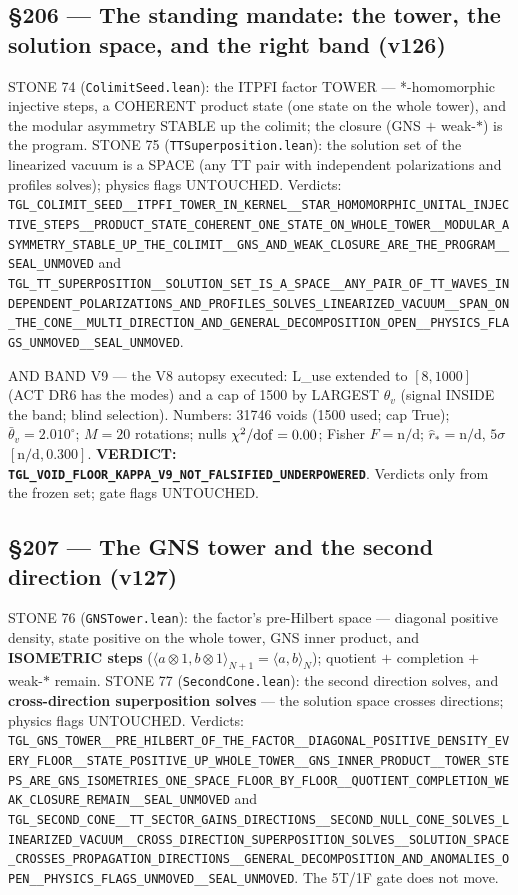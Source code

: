 \documentclass[11pt]{article}
\theoremstyle{definition}\newtheorem{deriv}{Derivation}
\begin{document}
\subsection*{\S206 --- The standing mandate: the tower, the solution space, and the right band (v126)}STONE 74 (\texttt{ColimitSeed.lean}): the ITPFI factor TOWER — *-homomorphic injective steps, a COHERENT product state (one state on the whole tower), and the modular asymmetry STABLE up the colimit; the closure (GNS $+$ weak-$*$) is the program. STONE 75 (\texttt{TTSuperposition.lean}): the solution set of the linearized vacuum is a SPACE (any TT pair with independent polarizations and profiles solves); physics flags UNTOUCHED. Verdicts: \texttt{TGL\_COLIMIT\_SEED\_\_ITPFI\_TOWER\_IN\_KERNEL\_\_STAR\_HOMOMORPHIC\_UNITAL\_INJECTIVE\_STEPS\_\_PRODUCT\_STATE\_COHERENT\_ONE\_STATE\_ON\_WHOLE\_TOWER\_\_MODULAR\_ASYMMETRY\_STABLE\_UP\_THE\_COLIMIT\_\_GNS\_AND\_WEAK\_CLOSURE\_ARE\_THE\_PROGRAM\_\_SEAL\_UNMOVED} and \texttt{TGL\_TT\_SUPERPOSITION\_\_SOLUTION\_SET\_IS\_A\_SPACE\_\_ANY\_PAIR\_OF\_TT\_WAVES\_INDEPENDENT\_POLARIZATIONS\_AND\_PROFILES\_SOLVES\_LINEARIZED\_VACUUM\_\_SPAN\_ON\_THE\_CONE\_\_MULTI\_DIRECTION\_AND\_GENERAL\_DECOMPOSITION\_OPEN\_\_PHYSICS\_FLAGS\_UNMOVED\_\_SEAL\_UNMOVED}.

AND BAND V9 — the V8 autopsy executed: L\_use extended to $[8,1000]$ (ACT DR6 has the modes) and a cap of 1500 by LARGEST $\theta_v$ (signal INSIDE the band; blind selection). Numbers: 31746 voids (1500 used; cap True); $\bar\theta_v=2.010^{\circ}$; $M=20$ rotations; nulls $\chi^2/{\rm dof}=0.00$; Fisher $F=\text{n/d}$; $\hat r_*=\text{n/d}$, $5\sigma$ $[\text{n/d},0.300]$. \textbf{VERDICT: \texttt{TGL\_VOID\_FLOOR\_KAPPA\_V9\_NOT\_FALSIFIED\_UNDERPOWERED}}. Verdicts only from the frozen set; gate flags UNTOUCHED.

\subsection*{\S207 --- The GNS tower and the second direction (v127)}STONE 76 (\texttt{GNSTower.lean}): the factor's pre-Hilbert space — diagonal positive density, state positive on the whole tower, GNS inner product, and \textbf{ISOMETRIC steps} ($\langle a\otimes1,b\otimes1\rangle_{N+1}=\langle a,b\rangle_N$); quotient $+$ completion $+$ weak-$*$ remain. STONE 77 (\texttt{SecondCone.lean}): the second direction solves, and \textbf{cross-direction superposition solves} — the solution space crosses directions; physics flags UNTOUCHED. Verdicts: \texttt{TGL\_GNS\_TOWER\_\_PRE\_HILBERT\_OF\_THE\_FACTOR\_\_DIAGONAL\_POSITIVE\_DENSITY\_EVERY\_FLOOR\_\_STATE\_POSITIVE\_UP\_WHOLE\_TOWER\_\_GNS\_INNER\_PRODUCT\_\_TOWER\_STEPS\_ARE\_GNS\_ISOMETRIES\_ONE\_SPACE\_FLOOR\_BY\_FLOOR\_\_QUOTIENT\_COMPLETION\_WEAK\_CLOSURE\_REMAIN\_\_SEAL\_UNMOVED} and \texttt{TGL\_SECOND\_CONE\_\_TT\_SECTOR\_GAINS\_DIRECTIONS\_\_SECOND\_NULL\_CONE\_SOLVES\_LINEARIZED\_VACUUM\_\_CROSS\_DIRECTION\_SUPERPOSITION\_SOLVES\_\_SOLUTION\_SPACE\_CROSSES\_PROPAGATION\_DIRECTIONS\_\_GENERAL\_DECOMPOSITION\_AND\_ANOMALIES\_OPEN\_\_PHYSICS\_FLAGS\_UNMOVED\_\_SEAL\_UNMOVED}. The 5T/1F gate does not move.
\end{document}

